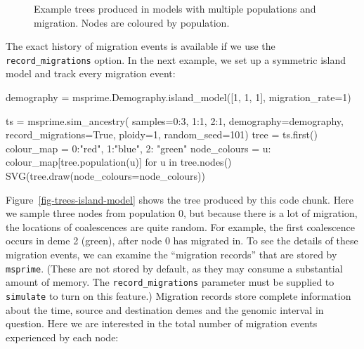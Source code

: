 \documentclass[graybox]{svmult}
\newcommand{\msprime}[0]{\texttt{msprime}}
\begin{document}
\begin{figure}[t]
\centering
{}
\qquad\qquad
{}
\caption{\label{fig-trees-migration} Example trees produced in models with multiple
populations and migration. Nodes are coloured by population.}
\end{figure}

The exact history of migration events is available if we use the
\texttt{record\_migrations} option. In the next example, we set up a
symmetric island model and track every migration event:

\begin{pythoncode}
demography =  msprime.Demography.island_model([1, 1, 1], migration_rate=1)

ts  = msprime.sim_ancestry(
    samples={0:3, 1:1, 2:1},
    demography=demography,
    record_migrations=True,
    ploidy=1,
    random_seed=101)
tree = ts.first()
colour_map = {0:"red", 1:"blue", 2: "green"}
node_colours = {u: colour_map[tree.population(u)] for u in tree.nodes()}
SVG(tree.draw(node_colours=node_colours))
\end{pythoncode}

Figure~\ref{fig-trees-island-model} shows the tree produced by this code
chunk. Here we sample three nodes from population 0, but because there is a lot of migration, the locations of coalescences are quite random. For
example, the first coalescence occurs in deme 2 (green), after node 0
has migrated in. To see the details of these migration events, we can
examine the ``migration records'' that are stored by \msprime. (These are
not stored by default, as they may consume a substantial amount of memory.
The \texttt{record\_migrations} parameter must be
supplied to \texttt{simulate} to turn on this feature.) Migration
records store complete information about the time, source and
destination demes and the genomic interval in question. Here we are
interested in the total number of migration events experienced by each node:
\end{document}
